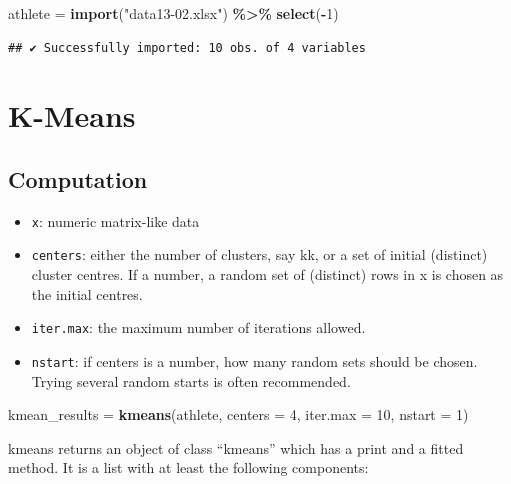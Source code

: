 \documentclass[
]{ctexart}
\newenvironment{Shaded}{\begin{snugshade}}{\end{snugshade}}
\newcommand{\AttributeTok}[1]{\textcolor[rgb]{0.13,0.29,0.53}{#1}}
\newcommand{\DecValTok}[1]{\textcolor[rgb]{0.00,0.00,0.81}{#1}}
\newcommand{\FunctionTok}[1]{\textcolor[rgb]{0.13,0.29,0.53}{\textbf{#1}}}
\newcommand{\NormalTok}[1]{#1}
\newcommand{\OtherTok}[1]{\textcolor[rgb]{0.56,0.35,0.01}{#1}}
\newcommand{\SpecialCharTok}[1]{\textcolor[rgb]{0.81,0.36,0.00}{\textbf{#1}}}
\newcommand{\StringTok}[1]{\textcolor[rgb]{0.31,0.60,0.02}{#1}}
\providecommand{\tightlist}{%
  \setlength{\itemsep}{0pt}\setlength{\parskip}{0pt}}
\begin{document}
\begin{Shaded}
\begin{Highlighting}[]
\NormalTok{athlete }\OtherTok{=} \FunctionTok{import}\NormalTok{(}\StringTok{"data13{-}02.xlsx"}\NormalTok{) }\SpecialCharTok{\%\textgreater{}\%} \FunctionTok{select}\NormalTok{(}\SpecialCharTok{{-}}\DecValTok{1}\NormalTok{)}
\end{Highlighting}
\end{Shaded}

\begin{verbatim}
## ✔ Successfully imported: 10 obs. of 4 variables
\end{verbatim}

\hypertarget{k-means}{%
\section{K-Means}\label{k-means}}

\hypertarget{computation}{%
\subsection{Computation}\label{computation}}

\begin{itemize}
\tightlist
\item
  \texttt{x}: numeric matrix-like data
\item
  \texttt{centers}: either the number of clusters, say kk, or a set of
  initial (distinct) cluster centres. If a number, a random set of
  (distinct) rows in x is chosen as the initial centres.
\item
  \texttt{iter.max}: the maximum number of iterations allowed.
\item
  \texttt{nstart}: if centers is a number, how many random sets should
  be chosen. Trying several random starts is often recommended.
\end{itemize}

\begin{Shaded}
\begin{Highlighting}[]
\NormalTok{kmean\_results }\OtherTok{=} \FunctionTok{kmeans}\NormalTok{(athlete, }\AttributeTok{centers =} \DecValTok{4}\NormalTok{, }
                       \AttributeTok{iter.max =} \DecValTok{10}\NormalTok{, }\AttributeTok{nstart =} \DecValTok{1}\NormalTok{)}
\end{Highlighting}
\end{Shaded}

kmeans returns an object of class ``kmeans'' which has a print and a
fitted method. It is a list with at least the following components:
\end{document}

